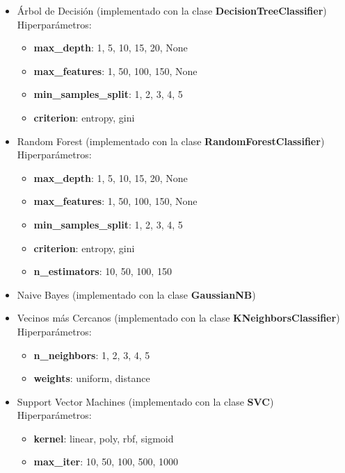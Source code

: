 \documentclass[10pt, a4paper]{article}
\begin{document}
\begin{itemize}
\item Árbol de Decisión (implementado con la clase \textbf{DecisionTreeClassifier}) \\
  Hiperparámetros:
  \begin{itemize}
    \item \textbf{max\_depth}: 1, 5, 10, 15, 20, None
    \item \textbf{max\_features}: 1, 50, 100, 150, None
    \item \textbf{min\_samples\_split}: 1, 2, 3, 4, 5
    \item \textbf{criterion}: entropy, gini
  \end{itemize}
\item Random Forest (implementado con la clase \textbf{RandomForestClassifier}) \\
  Hiperparámetros:
  \begin{itemize}
    \item \textbf{max\_depth}: 1, 5, 10, 15, 20, None
    \item \textbf{max\_features}: 1, 50, 100, 150, None
    \item \textbf{min\_samples\_split}: 1, 2, 3, 4, 5
    \item \textbf{criterion}: entropy, gini
    \item \textbf{n\_estimators}: 10, 50, 100, 150
  \end{itemize}
\item Naive Bayes (implementado con la clase \textbf{GaussianNB})
\item Vecinos más Cercanos (implementado con la clase \textbf{KNeighborsClassifier}) \\
  Hiperparámetros:
  \begin{itemize}
    \item \textbf{n\_neighbors}: 1, 2, 3, 4, 5
    \item \textbf{weights}: uniform, distance
  \end{itemize}
\item Support Vector Machines (implementado con la clase \textbf{SVC}) \\
  Hiperparámetros:
  \begin{itemize}
    \item \textbf{kernel}: linear, poly, rbf, sigmoid
    \item \textbf{max\_iter}: 10, 50, 100, 500, 1000
  \end{itemize}
\end{itemize}
\end{document}
